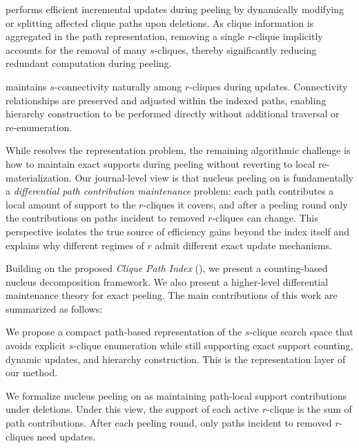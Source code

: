%
\cpi performs efficient incremental updates during peeling by dynamically modifying or splitting affected clique paths upon deletions.
As clique information is aggregated in the path representation, removing a single $r$-clique implicitly accounts for the removal of many $s$-cliques, thereby significantly reducing redundant computation during peeling.

%
\cpi maintains $s$-connectivity naturally among $r$-cliques during updates. 
Connectivity relationships are preserved and adjusted within the indexed paths, enabling hierarchy construction to be performed directly without additional traversal or re-enumeration.

%
While \cpi resolves the representation problem, the remaining algorithmic challenge is how to maintain exact supports during peeling without reverting to local re-materialization.
%
Our journal-level view is that nucleus peeling on \cpi is fundamentally a \emph{differential path contribution maintenance} problem:
each path contributes a local amount of support to the $r$-cliques it covers, and after a peeling round only the contributions on paths incident to removed $r$-cliques can change.
%
This perspective isolates the true source of efficiency gains beyond the index itself and explains why different regimes of $r$ admit different exact update mechanisms.




Building on the proposed \textit{Clique Path Index} (\cpi), we present a counting-based nucleus decomposition framework.
%
We also present a higher-level differential maintenance theory for exact peeling.
%
The main contributions of this work are summarized as follows:

%
We propose a compact path-based representation of the $s$-clique search space that avoids explicit $s$-clique enumeration while still supporting exact support counting, dynamic updates, and hierarchy construction.
%
This is the representation layer of our method.

%
We formalize nucleus peeling on \cpi as maintaining path-local support contributions under deletions.
%
Under this view, the support of each active $r$-clique is the sum of path contributions.
%
After each peeling round, only paths incident to removed $r$-cliques need updates.

